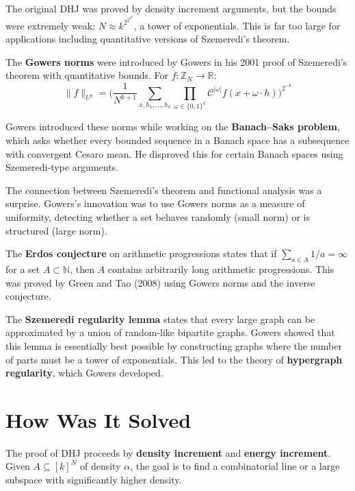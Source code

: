 The original DHJ was proved by density increment arguments, but the
bounds were extremely weak:
$N\approx k^{2^{2^{2^{k}}}}$, a tower of exponentials.  This is
far too large for applications including quantitative versions of
Szemeredi's theorem.

The \textbf{Gowers norms} were introduced by Gowers in his 2001
proof of Szemeredi's theorem with quantitative bounds.  For
$f\colon\mathbb{Z}_N\to\mathbb{R}$:
\[
  \|f\|_{U^k}
  = \Biggl(\frac{1}{N^{k+1}}
    \sum_{x,h_1,\dots,h_k}
    \prod_{\omega\in\{0,1\}^k}
      \mathcal{C}^{|\omega|}
        f(x+\omega\cdot h)\Biggr)^{2^{-k}}
\]

Gowers introduced these norms while working on the
\textbf{Banach--Saks problem}, which asks whether every bounded
sequence in a Banach space has a subsequence with convergent Cesaro
mean.  He disproved this for certain Banach spaces using
Szemeredi-type arguments.

The connection between Szemeredi's theorem and functional analysis
was a surprise.  Gowers's innovation was to use Gowers norms as a
measure of uniformity, detecting whether a set behaves randomly
(small norm) or is structured (large norm).

The \textbf{Erdos conjecture} on arithmetic progressions states that
if $\sum_{a\in A}1/a=\infty$ for a set $A\subset\mathbb{N}$, then
$A$ contains arbitrarily long arithmetic progressions.  This was
proved by Green and Tao (2008) using Gowers norms and the inverse
conjecture.

The \textbf{Szemeredi regularity lemma} states that every large
graph can be approximated by a union of random-like bipartite
graphs.  Gowers showed that this lemma is essentially best possible
by constructing graphs where the number of parts must be a tower of
exponentials.  This led to the theory of \textbf{hypergraph
regularity}, which Gowers developed.

\section{How Was It Solved}

The proof of DHJ proceeds by \textbf{density increment} and
\textbf{energy increment}.  Given
$A\subseteq[k]^N$ of density $\alpha$, the goal is to find a
combinatorial line or a large subspace with significantly higher
density.

